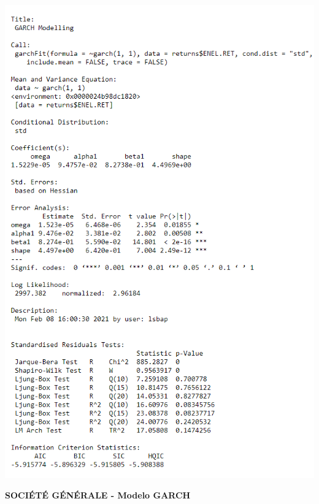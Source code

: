 \documentclass[
  12pt,
  a4paper,
  openany]{book}
\theoremstyle{definition}
\theoremstyle{definition}
\theoremstyle{definition}
\theoremstyle{remark}
\begin{document}
\begin{center}
\begin{minipage}{0.90\linewidth}
    \centering
    \includegraphics[width=2\textwidth]{image/garchenel.png}
\end{minipage}
\end{center}

\newpage

\begin{center}
 {\normalfont\Large\bfseries SOCIÉTÉ GÉNÉRALE - Modelo GARCH}
\end{center}
\end{document}

